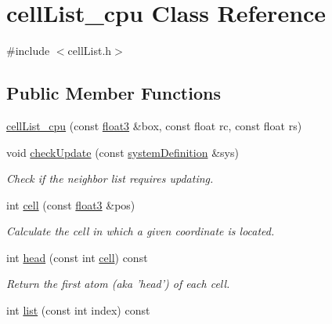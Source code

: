 \hypertarget{classcell_list__cpu}{\section{cell\-List\-\_\-cpu Class Reference}
\label{classcell_list__cpu}
}


{\ttfamily \#include $<$cell\-List.\-h$>$}

\subsection*{Public Member Functions}
\begin{DoxyCompactItemize}
\item 
\hyperlink{classcell_list__cpu_a2ac134374c8e561617433e03bb6b2d1e}{cell\-List\-\_\-cpu} (const \hyperlink{structfloat3}{float3} \&box, const float rc, const float rs)
\item 
void \hyperlink{classcell_list__cpu_a70568e6a2012eb8592f2798b3260c550}{check\-Update} (const \hyperlink{classsystem_definition}{system\-Definition} \&sys)
\begin{DoxyCompactList}\small\item\em Check if the neighbor list requires updating. \end{DoxyCompactList}\item 
int \hyperlink{classcell_list__cpu_a564d95c9bd7af0829291789d173361e0}{cell} (const \hyperlink{structfloat3}{float3} \&pos)
\begin{DoxyCompactList}\small\item\em Calculate the cell in which a given coordinate is located. \end{DoxyCompactList}\item 
\hypertarget{classcell_list__cpu_a0769d2a8a9c6964a8c6894bab9841e71}{int \hyperlink{classcell_list__cpu_a0769d2a8a9c6964a8c6894bab9841e71}{head} (const int \hyperlink{classcell_list__cpu_a564d95c9bd7af0829291789d173361e0}{cell}) const }\label{classcell_list__cpu_a0769d2a8a9c6964a8c6894bab9841e71}

\begin{DoxyCompactList}\small\item\em Return the first atom (aka 'head') of each cell. \end{DoxyCompactList}\item 
\hypertarget{classcell_list__cpu_ac274503e6cc75811e9cb9c07120fb96e}{int \hyperlink{classcell_list__cpu_ac274503e6cc75811e9cb9c07120fb96e}{list} (const int index) const }\label{classcell_list__cpu_ac274503e6cc75811e9cb9c07120fb96e}


\end{DoxyCompactItemize}
